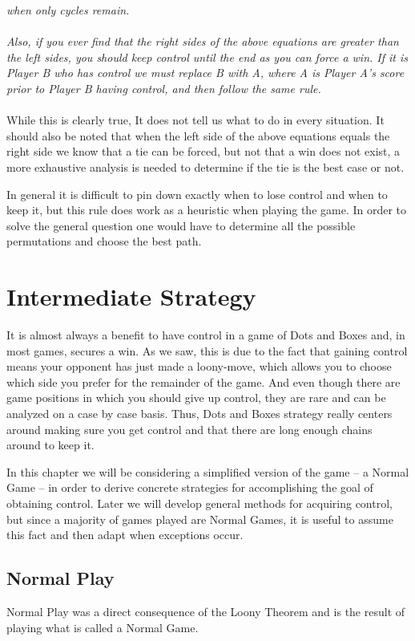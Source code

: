 \documentclass[12pt,twoside]{reedthesis}
\begin{document}
\noindent
\emph{when only cycles remain.}
\\\\
\noindent
\emph{Also, if you ever find that the right sides of the above equations are greater than the left sides, you should keep control until the end as you can force a win.  If it is Player B who has control we must replace B with A, where A is Player A's score prior to Player B having control, and then follow the same rule.}\\\\
While this is clearly true, It does not tell us what to do in every situation.  It should also be noted that when the left side of the above equations equals the right side we know that a tie can be forced, but not that a win does not exist, a more exhaustive analysis is needed to determine if the tie is the best case or not.

In general it is difficult to pin down exactly when to lose control and when to keep it, but this rule does work as a heuristic when playing the game.  In order to solve the general question one would have to determine all the possible permutations and choose the best path. 




\chapter{Intermediate Strategy}
It is almost always a benefit to have control in a game of Dots and Boxes and, in most games, secures a win.  As we saw, this is due to the fact that gaining control means your opponent has just made a loony-move, which allows you to choose which side you prefer for the remainder of the game.  And even though there are game positions in which you should give up control, they are rare and can be analyzed on a case by case basis.  Thus, Dots and Boxes strategy really centers around making sure you get control and that there are long enough chains around to keep it.

In this chapter we will be considering a simplified version of the game -- a Normal Game -- in order to derive concrete strategies for accomplishing the goal of obtaining control.  Later we will develop general methods for acquiring control, but since a majority of games played are Normal Games, it is useful to assume this fact and then adapt when exceptions occur. 


\section{Normal Play}
Normal Play was a direct consequence of the Loony Theorem and is the result of playing what is called a Normal Game.
\end{document}
